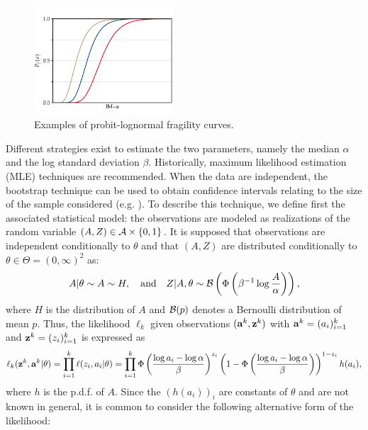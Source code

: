\begin{figure}[h]
    \centering
    \includegraphics[width=5.225cm]{figures/intro-frags/exfrags.pdf}
    \caption{Examples of probit-lognormal fragility curves.}
    \label{fig:intro-frags:exfrags}
\end{figure}


Different strategies exist to estimate the two parameters, namely the median $\alpha$ and the log standard deviation $\beta$. Historically, maximum likelihood estimation (MLE) techniques are recommended.  %
When the data are independent, the bootstrap technique can be used to obtain confidence intervals relating to the size of the sample considered (e.g. \cite{shinozuka_statistical_2000,zentner_numerical_2010,wang_influence_2020}). %
To describe this technique,
we define first the associated statistical model: the observations are modeled as realizations of the random variable $(A,Z)\in\mathcal{A}\times\{0,1\}$. It is supposed that observations are independent conditionally to $\theta$ and that $(A,Z)$ are distributed conditionally to $\theta\in\Theta=(0,\infty)^2$ as:
    \begin{equation}
            A|\theta\sim A\sim H,\quad\text{and}\quad Z|A,\theta\sim\mathcal{B}\left(\Phi\left(\beta^{-1}\log\frac{A}{\alpha}\right)\right),
    \end{equation}
where $H$ is the distribution of $A$ and $\mathcal{B}(p)$ denotes a Bernoulli distribution of mean  $p$.
Thus, the likelihood $\ell_k$ given observations $(\mathbf{a}^k,\mathbf{z}^k)$ with $\mathbf{a}^k=(a_i)_{i=1}^k$ and $\mathbf{z}^k=(z_i)_{i=1}^{k}$ is expressed as
    \begin{equation}
        \ell_k(\mathbf{z}^k,\mathbf{a}^k|\theta) = \prod_{i=1}^k\ell(z_i,a_i|\theta) = \prod_{i=1}^k\Phi\left(\frac{\log a_i-\log\alpha}{\beta}\right)^{z_i}\left(1-\Phi\left(\frac{\log a_i-\log\alpha}{\beta}\right)\right)^{1-z_i}h(a_i),
    \end{equation}
where $h$ is the p.d.f. of $A$. Since the $(h(a_i))_i$ are constants of $\theta$ and are not known in general, it is common to consider the following alternative form of the likelihood:
